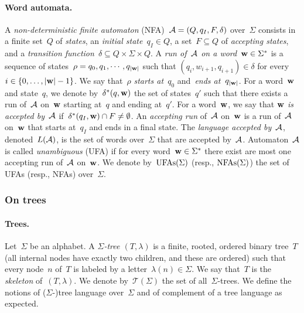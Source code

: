 \paragraph*{Word automata.}
A \emph{non-deterministic finite automaton} (NFA)~$\mathcal{A} = (Q,q_I,F,\delta)$
over~$\Sigma$ consists in a finite set~$Q$ of \emph{states}, an \emph{initial
state}~$q_I \in Q$, a set~$F \subseteq Q$ of \emph{accepting states}, and a
\emph{transition function}~$\delta \subseteq Q \times \Sigma \times Q$.  A
\emph{run of~$\mathcal{A}$ on a word~$\mathbf{w}\in \Sigma^*$} is a sequence of states~$\rho =
q_0, q_1, \cdots, q_{|\mathbf{w}|}$ such that $(q_i, w_{i+1}, q_{i+1}) \in \delta$ for
every~$i \in \{0,\ldots,|\mathbf{w}|-1\}$. We say that~$\rho$ \emph{starts at~$q_0$}
and~\emph{ends at~$q_{|\mathbf{w}|}$}.  For a word~$\mathbf{w}$ and state~$q$, we denote
by~$\delta^*(q,\mathbf{w})$ the set of states~$q'$ such that there exists a run of~$\mathcal{A}$
on~$\mathbf{w}$ starting at~$q$ and ending at~$q'$.  For a word~$\mathbf{w}$, we say that
\emph{$\mathbf{w}$ is accepted by~$\mathcal{A}$} if~$\delta^*(q_I,\mathbf{w}) \cap F \neq \emptyset$.
An \emph{accepting run} of~$\mathcal{A}$ on~$\mathbf{w}$ is a run of~$\mathcal{A}$ on~$\mathbf{w}$ that starts
at~$q_I$ and ends in a final state.
The \emph{language accepted by~$\mathcal{A}$}, denoted~$L(\mathcal{A})$, is the set of words
over~$\Sigma$ that are accepted by~$\mathcal{A}$.  Automaton~$\mathcal{A}$ is called
\emph{unambiguous} (UFA) if for every word~$\mathbf{w} \in \Sigma^*$ there exist are
most one accepting run of~$\mathcal{A}$ on~$\mathbf{w}$.
We denote by~$\textrm{UFAs}(\Sigma)$ (resp., $\textrm{NFAs}(\Sigma)$) the set of UFAs (resp.,
NFAs) over~$\Sigma$.  

\subsubsection{On trees}
\label{subsubsec:ufas-trees}

\paragraph*{Trees.}
Let~$\Sigma$ be an alphabet.  A \emph{$\Sigma$-tree $(T,\lambda)$} is a finite,
rooted, ordered binary tree~$T$ (all internal nodes have exactly two children,
and these are ordered) such that every node~$n$ of~$T$ is labeled by a
letter~$\lambda(n) \in \Sigma$. We say that~$T$ is the \emph{skeleton}
of~$(T,\lambda)$. We denote by~$\mathcal{T}(\Sigma)$ the set of
all~$\Sigma$-trees. We define the notions of ($\Sigma$-)tree language
over~$\Sigma$ and of complement of a tree language as expected.

